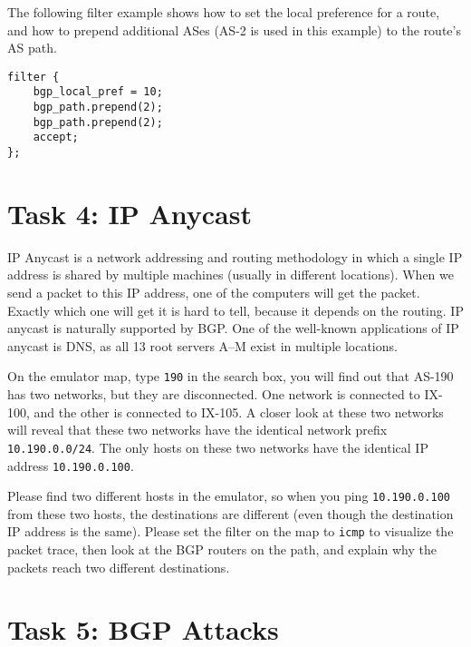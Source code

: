 The following filter example shows how to set the
local preference for a route, and how to prepend 
additional ASes (AS-2 is used in this example) to 
the route's AS path.

\begin{lstlisting}
filter {
    bgp_local_pref = 10;
    bgp_path.prepend(2);
    bgp_path.prepend(2);
    accept;
};
\end{lstlisting}
 


\section{Task 4: IP Anycast} 

IP Anycast is a network addressing and routing methodology in which a single
IP address is shared by multiple machines (usually in different locations).
When we send a packet to this IP address, one of the computers will get 
the packet. Exactly which one will get it is hard to tell, because it depends
on the routing. IP anycast is naturally supported by BGP. 
One of the well-known applications of IP anycast is DNS, 
as all 13 root servers A–M exist in multiple locations. 


On the emulator map, type \texttt{190} in the search box, you will find 
out that AS-190 has two networks, but they are disconnected. One network
is connected to IX-100, and the other is connected to IX-105. A closer 
look at these two networks will reveal that these two networks have the 
identical network prefix \texttt{10.190.0.0/24}. The only hosts on
these two networks have the identical IP address \texttt{10.190.0.100}. 

Please find two different hosts in the emulator, so 
when you ping \texttt{10.190.0.100} from these two hosts, 
the destinations are different (even though the destination
IP address is the same). Please set the filter on the map to
\texttt{icmp} to visualize the packet trace, then 
look at the BGP routers on the path, and explain why
the packets reach two different destinations. 

 

\section{Task 5: BGP Attacks} 


